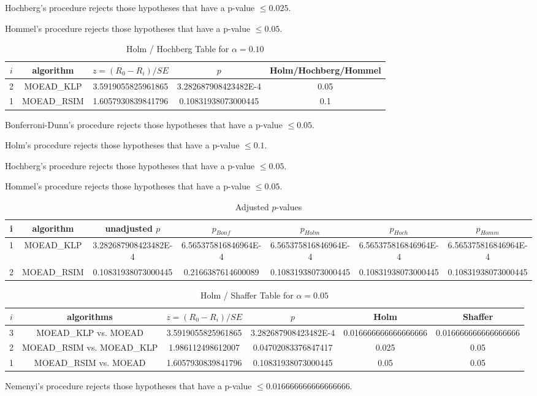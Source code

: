 \documentclass[a4paper,10pt]{article}
\begin{document}
\begin{landscape}
Hochberg's procedure rejects those hypotheses that have a p-value $\le0.025$.


Hommel's procedure rejects those hypotheses that have a p-value $\le0.05$.


\begin{table}[!htp]
\centering\tiny
\caption{Holm / Hochberg Table for $\alpha=0.10$}
\begin{tabular}{ccccc}
$i$&algorithm&$z=(R_0 - R_i)/SE$&$p$&Holm/Hochberg/Hommel\\
\hline
2&MOEAD_KLP&3.5919055825961865&3.282687908423482E-4&0.05\\
1&MOEAD_RSIM&1.6057930839841796&0.10831938073000445&0.1\\
\hline
\end{tabular}
\end{table}
Bonferroni-Dunn's procedure rejects those hypotheses that have a p-value $\le0.05$.


Holm's procedure rejects those hypotheses that have a p-value $\le0.1$.


Hochberg's procedure rejects those hypotheses that have a p-value $\le0.05$.


Hommel's procedure rejects those hypotheses that have a p-value $\le0.05$.


\begin{table}[!htp]
\centering\tiny
\caption{Adjusted $p$-values}
\begin{tabular}{ccccccc}
i&algorithm&unadjusted $p$&$p_{Bonf}$&$p_{Holm}$&$p_{Hoch}$&$p_{Homm}$\\
\hline
1&MOEAD_KLP&3.282687908423482E-4&6.565375816846964E-4&6.565375816846964E-4&6.565375816846964E-4&6.565375816846964E-4\\
2&MOEAD_RSIM&0.10831938073000445&0.2166387614600089&0.10831938073000445&0.10831938073000445&0.10831938073000445\\
\hline
\end{tabular}
\end{table}

\begin{table}[!htp]
\centering\tiny
\caption{Holm / Shaffer Table for $\alpha=0.05$}
\begin{tabular}{cccccc}
$i$&algorithms&$z=(R_0 - R_i)/SE$&$p$&Holm&Shaffer\\
\hline
3&MOEAD_KLP vs. MOEAD&3.5919055825961865&3.282687908423482E-4&0.016666666666666666&0.016666666666666666\\
2&MOEAD_RSIM vs. MOEAD_KLP&1.986112498612007&0.04702083376847417&0.025&0.05\\
1&MOEAD_RSIM vs. MOEAD&1.6057930839841796&0.10831938073000445&0.05&0.05\\
\hline
\end{tabular}
\end{table}
Nemenyi's procedure rejects those hypotheses that have a p-value $\le0.016666666666666666$.



\end{landscape}
\end{document}
